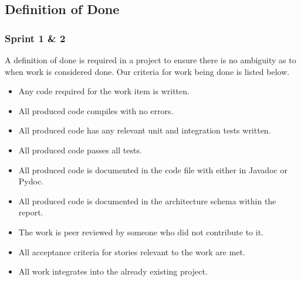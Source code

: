 \subsection{Definition of Done}
\subsubsection{Sprint 1 \& 2}
A definition of done is required in a project to ensure there is no ambiguity as to when work is considered done. Our criteria for work being done is listed below.
\begin{itemize}
    \item Any code required for the work item is written.
    \item All produced code compiles with no errors.
    \item All produced code has any relevant unit and integration tests written.
    \item All produced code passes all tests.
    \item All produced code is documented in the code file with either in Javadoc or Pydoc.
    \item All produced code is documented in the architecture schema within the report.
    \item The work is peer reviewed by someone who did not contribute to it.
    \item All acceptance criteria for stories relevant to the work are met.
    \item All work integrates into the already existing project.
\end{itemize}

